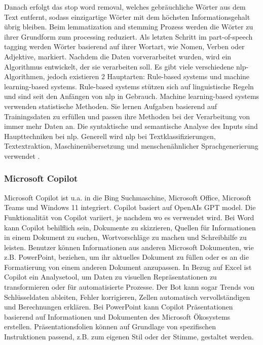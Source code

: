 Danach erfolgt das stop word removal, welches gebräuchliche Wörter aus dem Text entfernt, sodass einzigartige Wörter mit dem höchsten Informationsgehalt übrig bleiben. Beim lemmatization and stemming Prozess werden die Wörter zu ihrer Grundform zum processing reduziert. Als letzten Schritt im part-of-speech tagging werden Wörter basierend auf ihrer Wortart, wie Nomen, Verben oder Adjektive, markiert. Nachdem die Daten vorverarbeitet wurden, wird ein Algorithmus entwickelt, der sie verarbeiten soll. Es gibt viele verschiedene \gls{nlp}-Algorithmen, jedoch existieren 2 Hauptarten: Rule-based systems und machine learning-based systems. Rule-based systems stützen sich auf linguistische Regeln und sind seit den Anfängen von \gls{nlp} in Gebrauch. Machine learning-based systems verwenden statistische Methoden. Sie lernen Aufgaben basierend auf Trainingsdaten zu erfüllen und passen ihre Methoden bei der Verarbeitung von immer mehr Daten an. Die syntaktische und semantische Analyse des Inputs sind Haupttechniken bei \gls{nlp}. Generell wird \gls{nlp} bei Textklassifizierungen, Textextraktion, Maschinenübersetzung und menschenähnlicher Sprachgenerierung verwendet \cite{nlp-def}.

\subsubsection{Microsoft Copilot}
Microsoft Copilot ist u.a. in die Bing Suchmaschine, Microsoft Office, Microsoft Teams und Windows 11 integriert. Copilot basiert auf OpenAIs GPT model. Die Funktionalität von Copilot variiert, je nachdem wo es verwendet wird. Bei Word kann Copilot behilflich sein, Dokumente zu skizzieren, Quellen für Informationen in einem Dokument zu suchen, Wortvorschläge zu machen und Schreibhilfe zu leisten. Benutzer können Informationen aus anderen Microsoft Dokumenten, wie z.B. PowerPoint, beziehen, um ihr aktuelles Dokument zu füllen oder es an die Formatierung von einem anderen Dokument anzupassen. In Bezug auf Excel ist Copilot ein Analysetool, um Daten zu visuellen Repräsentationen zu transformieren oder für automatisierte Prozesse. Der Bot kann sogar Trends von Schlüsseldaten ableiten, Fehler korrigieren, Zellen automatisch vervollständigen und Berechnungen erklären. Bei PowerPoint kann Copilot Präsentationen basierend auf Informationen und Dokumenten des Microsoft Ökosystems erstellen. Präsentationsfolien können auf Grundlage von spezifischen Instruktionen passend, z.B. zum eigenen Stil oder der Stimme, gestaltet werden. 

